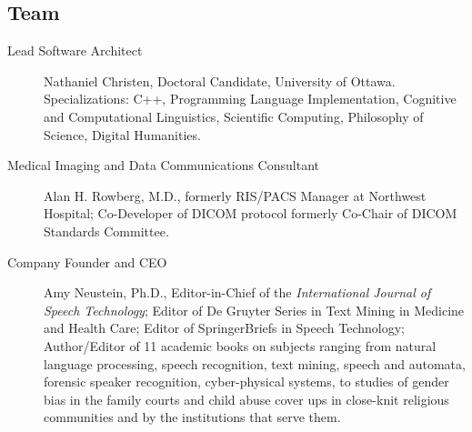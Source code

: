 
\begin{frame}{}
\section{Team}


\begin{center}
\begin{minipage}{0.84\textwidth}
{\LARGE \setlength{\leftmargini}{3pt}\begin{description}
\item[Lead Software Architect]  {\lsep} Nathaniel Christen, Doctoral Candidate, University of Ottawa.  
Specializations: C++, Programming Language 
Implementation, Cognitive and Computational 
Linguistics, Scientific Computing, Philosophy 
of Science, Digital Humanities.{\thrule}
\item[Medical Imaging and Data Communications Consultant]  {\lsep} Alan H. Rowberg, M.D., formerly
RIS/PACS Manager at Northwest Hospital; Co-Developer of DICOM protocol formerly Co-Chair
of DICOM Standards Committee.{\thrule}
\item[Company Founder and CEO]  {\lsep} Amy Neustein, Ph.D., Editor-in-Chief of the \textit{International Journal of
Speech Technology}; Editor of De Gruyter Series in Text Mining in Medicine and Health Care;
Editor of SpringerBriefs in Speech Technology; Author/Editor of 11 academic books on subjects
ranging from natural language processing, speech recognition, text mining, speech and
automata, forensic speaker recognition, cyber-physical systems, to studies of gender bias in the
family courts and child abuse cover ups in close-knit religious communities and by the institutions
that serve them.\vspace{1em}  
\end{description}}
\end{minipage}
\end{center}


\end{frame}
